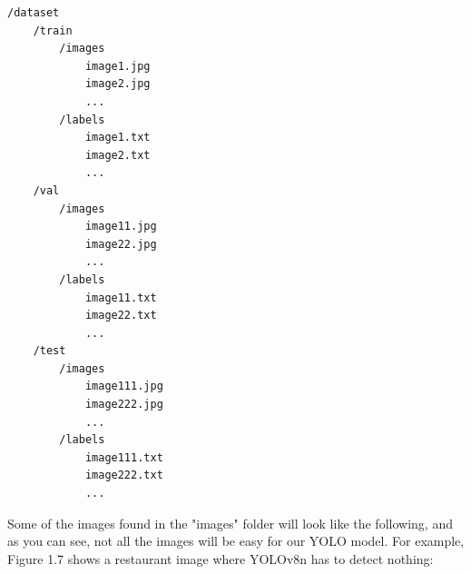 \documentclass[../main]{subfiles}
\begin{document}
\begin{lstlisting}
/dataset
    /train
        /images
            image1.jpg
            image2.jpg
            ...
        /labels
            image1.txt
            image2.txt
            ...
    /val
        /images
            image11.jpg
            image22.jpg
            ...
        /labels
            image11.txt
            image22.txt
            ...
    /test
        /images
            image111.jpg
            image222.jpg
            ...
        /labels
            image111.txt
            image222.txt
            ...
\end{lstlisting}

Some of the images found in the "images" folder will look like the following, and as you can see, not all the images will be easy for our YOLO model. For example, Figure 1.7 shows a restaurant image where YOLOv8n has to detect nothing:
\end{document}
